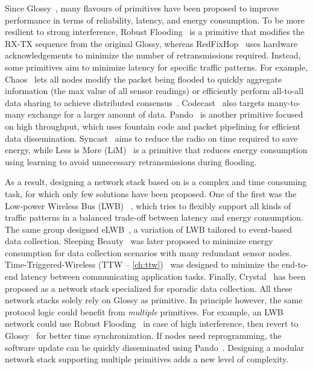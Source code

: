 Since Glossy~\cite{ferrari2011Glossy}, many flavours of \ST primitives have been proposed to improve performance in terms of reliability, latency, and energy consumption.
To be more resilient to strong interference, Robust Flooding~\cite{lim2017Competition} is a primitive that modifies the RX-TX sequence from the original Glossy, whereas RedFixHop~\cite{escobar2016RedFixHop} uses hardware acknowledgements to minimize the number of retransmissions required.
Instead, some primitives aim to minimize latency for specific traffic patterns.
For example, Chaos~\cite{landsiedel2013Chaos} lets all nodes modify the packet being flooded to quickly aggregate information (\eg the max value of all sensor readings) or efficiently perform all-to-all data sharing to achieve distributed consensus~\cite{alnahas2017a2}.
Codecast~\cite{mohammad2018Codecast} also targets many-to-many exchange for a larger amount of data.
Pando~\cite{du2015Pando} is another primitive focused on high throughput, which uses fountain code and packet pipelining for efficient data dissemination.
Syncast~\cite{mohammad2017Improving} aims to reduce the radio on time required to save energy, while Less is More (LiM)~\cite{zhang2017LiM} is a primitive that reduces energy consumption using learning to avoid unnecessary retransmissions during flooding.


As a result, designing a network stack based on \ST is a complex and time consuming task, for which only few solutions have been proposed.
One of the first was the Low-power Wireless Bus (LWB) ~\cite{ferrari2012LWB}, which tries to flexibly support all kinds of traffic patterns in a balanced trade-off between latency and energy consumption.
The same group designed eLWB~\cite{sutton2017eLWB}, a variation of LWB tailored to event-based data collection.
Sleeping Beauty~\cite{sarkar2016Sleeping} was later proposed to minimize energy consumption for data collection scenarios with many redundant sensor nodes.
Time-Triggered-Wireless (TTW -- \cref{ch:ttw})~\cite{jacob2017TTW_extended} was designed to minimize the end-to-end latency between communicating application tasks.
Finally, Crystal~\cite{istomin2018Interferenceresilient} has been proposed as a network stack specialized for sporadic data collection.
All these network stacks solely rely on Glossy as \ST primitive.
%
In principle however, the same protocol logic could benefit from \textsl{multiple} primitives. For example, an LWB network could use Robust Flooding~\cite{lim2017Competition} in case of high interference, then revert to Glossy~\cite{ferrari2011Glossy} for better time synchronization. If nodes need reprogramming, the software update can be quickly disseminated using Pando~\cite{du2015Pando}.
Designing a modular network stack supporting multiple \ST primitives adds a new level of complexity.

